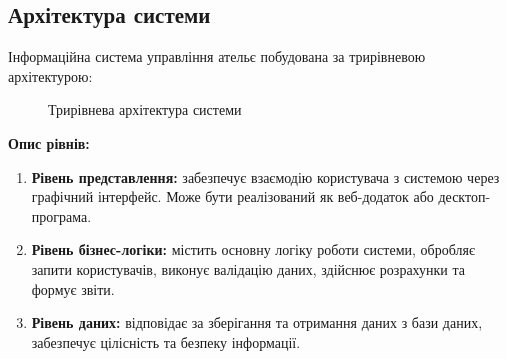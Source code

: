 \documentclass[14pt,a4paper]{extarticle}
\begin{document}
\newpage
\subsection{Архітектура системи}

Інформаційна система управління ательє побудована за трирівневою архітектурою:

\begin{figure}[h!]
\centering
{}
\caption{Трирівнева архітектура системи}
\end{figure}

\textbf{Опис рівнів:}

\begin{enumerate}
    \item \textbf{Рівень представлення:} забезпечує взаємодію користувача з системою через графічний інтерфейс. Може бути реалізований як веб-додаток або десктоп-програма.
    
    \item \textbf{Рівень бізнес-логіки:} містить основну логіку роботи системи, обробляє запити користувачів, виконує валідацію даних, здійснює розрахунки та формує звіти.
    
    \item \textbf{Рівень даних:} відповідає за зберігання та отримання даних з бази даних, забезпечує цілісність та безпеку інформації.
\end{enumerate}
\end{document}
